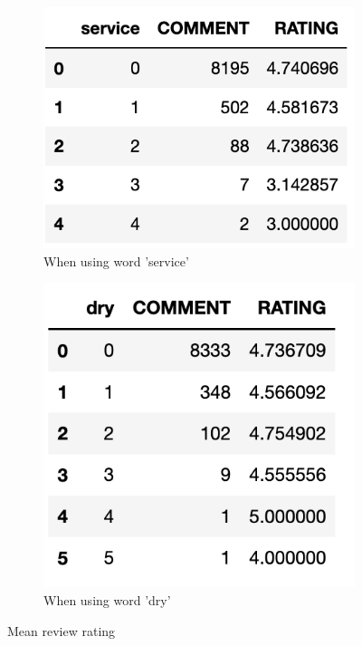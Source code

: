 \documentclass[11pt, letterpaper]{article}
\begin{document}
\begin{figure}[H]  
\centering
\begin{subfigure}[b]{0.45\textwidth}
         \centering
         \includegraphics[width=\textwidth]{eda_by_service.png}
         \caption{When using word 'service'}
         \label{fig:eda_by_service}
\end{subfigure}
\hfill
\begin{subfigure}[b]{0.45\textwidth}
         \centering
         \includegraphics[width=\textwidth]{eda_by_dry.png}
         \caption{When using word 'dry'}
         \label{fig:eda_by_dry}
\end{subfigure}
         \caption{Mean review rating}
         \label{fig:eda_review_rating_words}
\end{figure}
\end{document}
